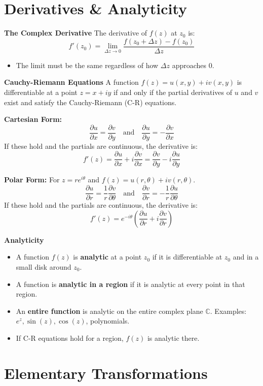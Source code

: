 \documentclass{../cheatsheet}
\begin{document}
\begin{multicols}{3}
\section{Derivatives & Analyticity}

\textbf{The Complex Derivative}
The derivative of $f(z)$ at $z_0$ is:
$$f'(z_0) = \lim_{\Delta z \to 0} \frac{f(z_0 + \Delta z) - f(z_0)}{\Delta z}$$
\begin{itemize}
    \item The limit must be the same regardless of how $\Delta z$ approaches 0.
\end{itemize}

\textbf{Cauchy-Riemann Equations}
A function $f(z) = u(x,y) + iv(x,y)$ is differentiable at a point $z=x+iy$ if and only if the partial derivatives of $u$ and $v$ exist and satisfy the Cauchy-Riemann (C-R) equations.

\textbf{Cartesian Form:}
$$\frac{\partial u}{\partial x} = \frac{\partial v}{\partial y} \quad \text{and} \quad \frac{\partial u}{\partial y} = -\frac{\partial v}{\partial x}$$
If these hold and the partials are continuous, the derivative is:
$$f'(z) = \frac{\partial u}{\partial x} + i\frac{\partial v}{\partial x} = \frac{\partial v}{\partial y} - i\frac{\partial u}{\partial y}$$

\textbf{Polar Form:} For $z=re^{i\theta}$ and $f(z)=u(r,\theta)+iv(r,\theta)$.
$$\frac{\partial u}{\partial r} = \frac{1}{r}\frac{\partial v}{\partial \theta} \quad \text{and} \quad \frac{\partial v}{\partial r} = -\frac{1}{r}\frac{\partial u}{\partial \theta}$$
If these hold and the partials are continuous, the derivative is:
$$f'(z) = e^{-i\theta}\left(\frac{\partial u}{\partial r} + i\frac{\partial v}{\partial r}\right)$$

\textbf{Analyticity}
\begin{itemize}
    \item A function $f(z)$ is \textbf{analytic} at a point $z_0$ if it is differentiable at $z_0$ and in a small disk around $z_0$.
    \item A function is \textbf{analytic in a region} if it is analytic at every point in that region.
    \item An \textbf{entire function} is analytic on the entire complex plane $\mathbb{C}$. Examples: $e^z, \sin(z), \cos(z)$, polynomials.
    \item If C-R equations hold for a region, $f(z)$ is analytic there.
\end{itemize}


\section{Elementary Transformations}


\end{multicols}
\end{document}
